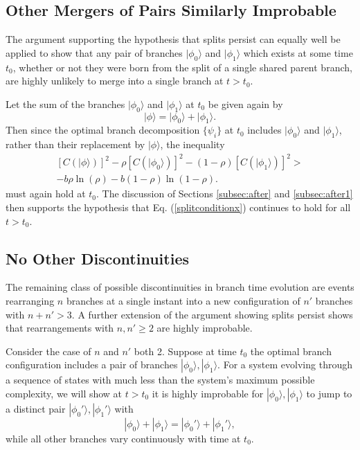 \documentclass[12pt,amsmath,amssymb,onecolumn]{revtex4-2}
\begin{document}
\subsection{\label{subsec:dontmerge} Other Mergers of Pairs Similarly Improbable}

The argument supporting the hypothesis that splits persist can equally well be applied
to show that any pair of branches $|\phi_0 \rangle $ and
$|\phi_1 \rangle $ which exists at some time $t_0$, whether or
not they were born from the split
of a single shared parent branch, are highly unlikely to
merge into a single branch at $t > t_0$.

Let the sum of the branches $|\phi_0 \rangle $ and $|\phi_1 \rangle $ at $t_0$ be given
again by
\begin{equation}\label{splitphix}
|\phi \rangle  = |\phi_0 \rangle  + |\phi_1 \rangle .
\end{equation}
Then since the optimal branch decomposition
$\{ \psi_i\}$ at $t_0$ includes $|\phi_0 \rangle $ and $|\phi_1 \rangle $, rather than
their replacement by $|\phi \rangle $, the inequality
\begin{multline}\label{splitconditionx}
[C( |\phi \rangle )]^2 - \rho [C( |\phi_0 \rangle )]^2 - ( 1 - \rho) [C( |\phi_1 \rangle )]^2 > \\
-b \rho \ln( \rho) - b ( 1 - \rho) \ln( 1 - \rho).
\end{multline}
must again hold at $t_0$. The discussion of Sections \ref{subsec:after}
and \ref{subsec:after1} then supports the hypothesis that
Eq. (\ref{splitconditionx}) continues to hold for all $t > t_0$.

\subsection{\label{subsec:norearrangments} No Other Discontinuities}

The remaining class of possible discontinuities
in branch time evolution 
are events
rearranging $n$ branches
at a single instant into a new configuration of $n'$ branches with $n + n' > 3$.
A further extension
of the argument showing splits persist
shows that rearrangements with $n, n' \ge 2$
are highly improbable.


Consider the case of $n$ and $n'$ both 2.
Suppose at time $t_0$ the optimal branch configuration includes
a pair of branches $|\phi_0 \rangle , |\phi_1 \rangle $.
For a system evolving through a sequence
of states with much less than the system's
maximum possible complexity,
we will show at $t > t_0$ it is highly improbable for
$|\phi_0 \rangle , |\phi_1 \rangle $
to jump to
a distinct pair $|\phi_0' \rangle , |\phi_1' \rangle $ with
\begin{equation}
  \label{merger2}
  |\phi_0 \rangle  + |\phi_1 \rangle  = |\phi_0' \rangle  + |\phi_1' \rangle ,
\end{equation}
while all other branches
vary continuously with time at $t_0$.
\end{document}
